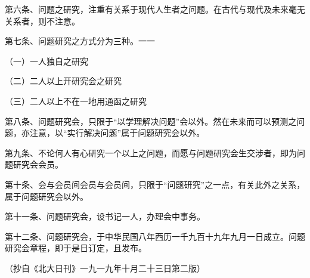 第六条、问题之研究，注重有关系于现代人生者之问题。在古代与现代及未来毫无关系者，则不注意。

第七条、问题研究之方式分为三种。一一

（一）一人独自之研究

（二）二人以上开研究会之研究

（三）二人以上不在一地用通函之研究

第八条、问题研究会，只限于“以学理解决问题”会以外。然在未来而可以预测之问题，亦注意，以“实行解决问题”属于问题研究会以外。

第九条、不论何人有心研究一个以上之问题，而愿与问题研究会生交涉者，即为问题研究会会员。

第十条、会与会员间会员与会员间，只限于“问题研究”之一点，有关此外之关系，属于问题研究会以外。

第十一条、问题研究会，设书记一人，办理会中事务。

第十二条、问题研究会，于中华民国八年西历一千九百十九年九月一日成立。问题研究会章程，即于是日订定，且发布。

\begin{flushright}（抄自《北大日刊》一九一九年十月二十三日第二版）\end{flushright}

